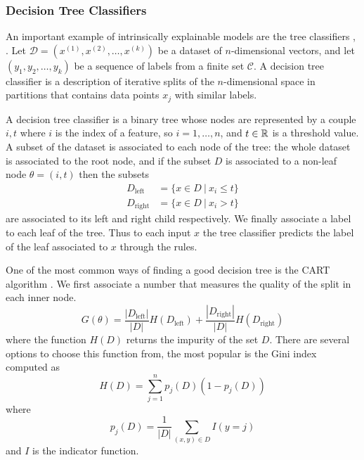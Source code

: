 \documentclass[]{marticle}
\newcommand{\ds}{\mathcal{D}}
\newcommand{\codes}{\mathcal{C}}
\begin{document}
\subsubsection{Decision Tree Classifiers}

An important example of intrinsically explainable models are the tree classifiers
\cite{tibsharani-elements}, \cite{trees-breiman}. Let $\ds=(x^{(1)}, x^{(2)}, \dots, x^{(k)})$ be a
dataset of $n$-dimensional vectors, and let $(y_1, y_2, \dots, y_k)$ be a sequence of labels from a
finite set $\codes$. A decision tree classifier is a description of iterative splits of the
$n$-dimensional space in partitions that contains data points $x_j$ with similar labels.

A decision tree classifier is a binary tree whose nodes are represented by a couple $i, t$ where $i$
is the index of a feature, so $i=1,\dots,n$, and $t\in\mathbb{R}$ is a threshold value. A subset of the
dataset is associated to each node of the tree: the whole dataset is associated to the root node,
and if the subset $D$ is associated to a non-leaf node $\theta = (i, t)$ then the subsets
\begin{align*}
    D_\text{left}  &= \{x \in D \ |\ x_i \leq t\} \\
    D_\text{right} &= \{x \in D \ |\ x_i >    t\}
\end{align*}
are associated to its left and right child respectively. We finally associate a label to each leaf
of the tree. Thus to each input $x$ the tree classifier predicts the label of the leaf associated to
$x$ through the rules.

One of the most common ways of finding a good decision tree is the CART algorithm
\cite{tibsharani-elements}. We first associate a number that measures the quality of the split in
each inner node.
\begin{equation*}
    G(\theta) = \frac{|D_\text{left}|}{|D|} H(D_\text{left}) + \frac{|D_\text{right}|}{|D|}
    H(D_\text{right})
\end{equation*}
where the function $H(D)$ returns the impurity of the set $D$. There are several options to choose
this function from, the most popular is the Gini index computed as 
\begin{equation*}
    H(D) = \sum_{j=1}^n p_j(D)\left(1-p_j(D)\right)
\end{equation*}
where
\begin{equation*}
    p_j(D) = \frac{1}{|D|}\sum_{(x,y)\in D}I(y = j)
\end{equation*}
and $I$ is the indicator function.
\end{document}
